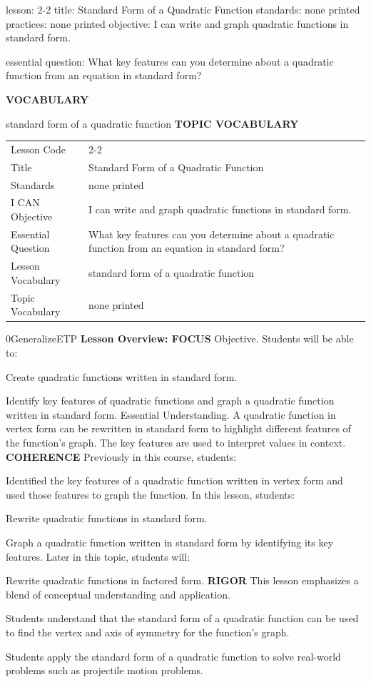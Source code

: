 \documentclass{article}
\newenvironment{lesson-meta}{}{}        %
\newenvironment{te-addendum}[2]{}{}     %
\newcommand{\te}[1]{}                   %
\begin{document}
\begin{lesson-meta}
lesson: 2-2
title: Standard Form of a Quadratic Function
standards: none printed
practices: none printed
objective: I can write and graph quadratic functions in standard form.

essential question: What key features can you determine about a quadratic function from an equation in standard form?

\textbf{VOCABULARY}
\item standard form of a quadratic function
\textbf{TOPIC VOCABULARY}
\te{No topic vocabulary list is printed on these lesson pages.}
\begin{tabular}{ll}
Lesson Code & 2-2 \\
Title & Standard Form of a Quadratic Function \\
Standards & none printed \\
I CAN Objective & I can write and graph quadratic functions in standard form. \\
Essential Question & What key features can you determine about a quadratic function from an equation in standard form? \\
Lesson Vocabulary & standard form of a quadratic function \\
Topic Vocabulary & none printed \\
\end{tabular}
\end{lesson-meta}
\begin{te-addendum}{0}{GeneralizeETP}
\textbf{Lesson Overview: FOCUS}
Objective. Students will be able to:
\item Create quadratic functions written in standard form.
\item Identify key features of quadratic functions and graph a quadratic function written in standard form.
Essential Understanding. A quadratic function in vertex form can be rewritten in standard form to highlight different features of the function's graph. The key features are used to interpret values in context.
\textbf{COHERENCE}
Previously in this course, students:
\item Identified the key features of a quadratic function written in vertex form and used those features to graph the function.
In this lesson, students:
\item Rewrite quadratic functions in standard form.
\item Graph a quadratic function written in standard form by identifying its key features.
Later in this topic, students will:
\item Rewrite quadratic functions in factored form.
\textbf{RIGOR}
This lesson emphasizes a blend of conceptual understanding and application.
\item Students understand that the standard form of a quadratic function can be used to find the vertex and axis of symmetry for the function's graph.
\item Students apply the standard form of a quadratic function to solve real-world problems such as projectile motion problems.
\end{te-addendum}
\end{document}

